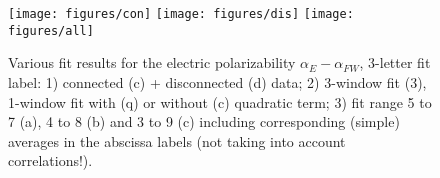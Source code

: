 
\begin{figure}[H]
\centering
\texttt{[image: figures/con]}
\texttt{[image: figures/dis]}\;\;
\texttt{[image: figures/all]}
\caption{Various fit results for the electric polarizability $\alpha_E-\alpha_{FW}$, 3-letter fit label: 1) connected (c) + disconnected (d) data; 2) 3-window fit (3), 1-window fit with (q) or without (c) quadratic term; 3) fit range 5 to 7 (a), 4 to 8 (b) and 3 to 9 (c) including corresponding (simple) averages in the abscissa labels (not taking into account correlations!).}
\label{fig:Correlators3wAll}
\end{figure}
